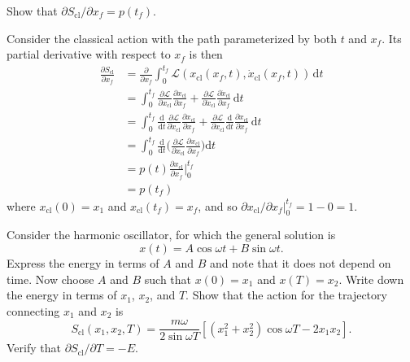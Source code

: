 \documentclass[../principles-of-quantum-mechanics.tex]{subfiles}
\begin{document}
\begin{questions}
		\question Show that $\partial S_{\text{cl}}/\partial x_f = p(t_f)$.
		
		\begin{solution}
			Consider the classical action with the path parameterized by both $t$ and $x_f$. Its partial derivative with respect to $x_f$ is then
			\begin{align*}
				\frac{\partial S_{\text{cl}}}{\partial x_f} &= \frac{\partial}{\partial x_f}\int_0^{t_f}\mathcal{L}(x_{\text{cl}}(x_f, t), \dot{x}_{\text{cl}}(x_f, t))\,\mathrm{d}t \\
				&= \int_0^{t_f}\frac{\partial \mathcal{L}}{\partial x_{\text{cl}}}\frac{\partial x_{\text{cl}}}{\partial x_f} + \frac{\partial \mathcal{L}}{\partial \dot{x}_{\text{cl}}}\frac{\partial \dot{x}_{\text{cl}}}{\partial x_f}\,\mathrm{d}t \\
				&= \int_0^{t_f}\frac{\mathrm{d}}{\mathrm{d}t}\frac{\partial \mathcal{L}}{\partial \dot{x}_{\text{cl}}}\frac{\partial x_{\text{cl}}}{\partial x_f} + \frac{\partial \mathcal{L}}{\partial \dot{x}_{\text{cl}}}\frac{\mathrm{d}}{\mathrm{d}t}\frac{\partial x_{\text{cl}}}{\partial x_f}\,\mathrm{d}t \\
				&= \int_0^{t_f}\frac{\mathrm{d}}{\mathrm{d}t}\Big(\frac{\partial \mathcal{L}}{\partial \dot{x}_{\text{cl}}}\frac{\partial x_{\text{cl}}}{\partial x_f}\Big)\mathrm{d}t \\
				&= p(t)\frac{\partial x_{\text{cl}}}{\partial x_f}\Big|_0^{t_f} \\
				&= p(t_f)
			\end{align*}
			where $x_{\text{cl}}(0) = x_1$ and $x_{\text{cl}}(t_f) = x_f$, and so $\partial x_{\text{cl}}/\partial x_f|_0^{t_f} = 1 - 0 = 1$.
		\end{solution}
		
		\question Consider the harmonic oscillator, for which the general solution is
		\[
			x(t) = A\cos\omega t + B\sin\omega t.
		\]
		Express the energy in terms of $A$ and $B$ and note that it does not depend on time. Now choose $A$ and $B$ such that $x(0) = x_1$ and $x(T) = x_2$. Write down the energy in terms of $x_1$, $x_2$, and $T$. Show that the action for the trajectory connecting $x_1$ and $x_2$ is
		\[
			S_{\text{cl}}(x_1, x_2, T) = \frac{m\omega}{2\sin\omega T}[(x_1^2+x_2^2)\cos\omega T - 2x_1x_2].
		\]
		Verify that $\partial S_{\text{cl}}/\partial T = -E$.
		

\end{questions}
\end{document}
